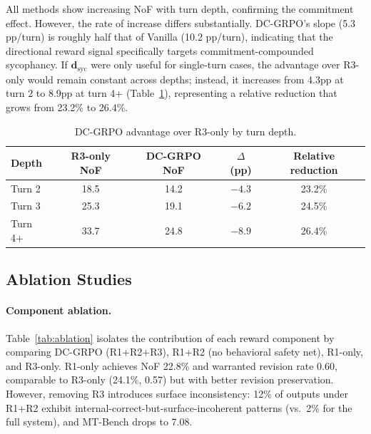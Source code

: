 \documentclass[11pt]{article}
\begin{document}
All methods show increasing NoF with turn depth, confirming the commitment effect. However, the rate of increase differs substantially. DC-GRPO's slope (5.3 pp/turn) is roughly half that of Vanilla (10.2 pp/turn), indicating that the directional reward signal specifically targets commitment-compounded sycophancy. If $\mathbf{d}_\text{syc}$ were only useful for single-turn cases, the advantage over R3-only would remain constant across depths; instead, it increases from 4.3pp at turn 2 to 8.9pp at turn 4+ (Table~\ref{tab:depth_advantage}), representing a relative reduction that grows from 23.2\% to 26.4\%.

\begin{table}[h]
\centering
\caption{DC-GRPO advantage over R3-only by turn depth.}
\label{tab:depth_advantage}
\begin{tabular}{lcccc}
\toprule
Depth & R3-only NoF & DC-GRPO NoF & $\Delta$ (pp) & Relative reduction \\
\midrule
Turn 2  & 18.5 & 14.2 & $-4.3$ & 23.2\% \\
Turn 3  & 25.3 & 19.1 & $-6.2$ & 24.5\% \\
Turn 4+ & 33.7 & 24.8 & $-8.9$ & 26.4\% \\
\bottomrule
\end{tabular}
\end{table}

\subsection{Ablation Studies}
\label{sec:ablation}

\paragraph{Component ablation.}
Table~\ref{tab:ablation} isolates the contribution of each reward component by comparing DC-GRPO (R1+R2+R3), R1+R2 (no behavioral safety net), R1-only, and R3-only. R1-only achieves NoF 22.8\% and warranted revision rate 0.60, comparable to R3-only (24.1\%, 0.57) but with better revision preservation. However, removing R3 introduces surface inconsistency: 12\% of outputs under R1+R2 exhibit internal-correct-but-surface-incoherent patterns (vs.\ 2\% for the full system), and MT-Bench drops to 7.08.
\end{document}
